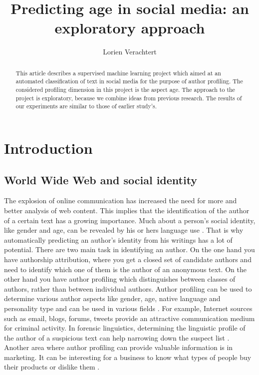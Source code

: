 \documentclass{clv3}
\begin{document}
\title{Predicting age in social media: an exploratory approach}


\author{Lorien Verachtert}



\maketitle

\begin{abstract}
This article describes a supervised machine learning project which aimed at an automated classification of text in social media  for the purpose of author profiling. The considered profiling dimension in this project is the aspect age. The approach to the project is exploratory, because we combine ideas from previous research. The results of our experiments are similar to those of earlier study's.
\end{abstract}

\section{Introduction}
\subsection{World Wide Web and social identity}

The explosion of  online  communication  has  increased  the  need  for  more and better  analysis  of  web  content. This implies that the identification of the author of a certain text has a growing importance. Much about a person's social identity, like gender and age, can be revealed by his or hers language use \citep{nguyen2013old}. That is why automatically  predicting  an author's identity from his writings has a lot of potential. There are two main task in identifying  an author. On the one hand you have authorship attribution, where you get a closed set of candidate authors and need to identify which one of them is the author of an anonymous text.  On the other hand you have author profiling which distinguishes between classes of authors, rather than between individual authors. Author profiling can be used to determine various author aspects like gender, age, native language and personality type and can be used in various fields \citep{rangel2013overview}. For example, Internet sources such as email, blogs, forums, tweets provide an  attractive  communication  medium  for criminal activity. In forensic linguistics, determining the linguistic profile of the author of a suspicious text can help narrowing down the suspect list \citep{abbasi2005applying,estival2007author,rangel2013overview}. Another area where author profiling can provide valuable information is in marketing. It can be interesting for a business to know what types of people buy their products or dislike them \citep{glance2005deriving,rangel2013overview}.
\end{document}
